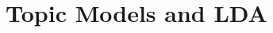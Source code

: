 \message{ !name(sgerrish_prefpo.tex)}\documentclass{beamer}
\begin{document}
\section{Topic Models and LDA}








\end{document}

